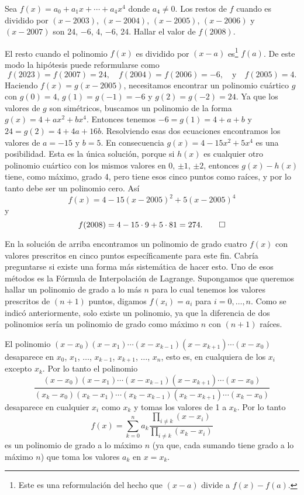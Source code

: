 \begin{example}
    Sea $f(x) = a_0 + a_1 x + \cdots + a_4 x^4$ donde $a_4 \neq 0$.
    Los restos de $f$ cuando es dividido por $(x - 2003)$, $(x - 2004)$, $(x - 2005)$, $(x - 2006)$ y $(x - 2007)$ son 24, $-6$, 4, $-6$, 24.
    Hallar el valor de $f(2008)$.
\end{example}
\begin{solution}
    El resto cuando el polinomio $f(x)$ es dividido por $(x - a)$ es\footnote{Este es una reformulación del hecho que $(x - a)$ divide a $f(x) - f(a)$.} $f(a)$.
    De este modo la hipótesis puede reformularse como
    \[
        f(2023) = f(2007) = 24, \quad f(2004) = f(2006) = -6, \quad \text{y} \quad f(2005) = 4.
    \]
    Haciendo $f(x) = g(x - 2005)$, necesitamos encontrar un polinomio cuártico $g$ con $g(0) = 4$, $g(1) = g(-1) = -6$ y $g(2) = g(-2) = 24$.
    Ya que los valores de $g$ son simétricos, buscamos un polinomio de la forma $g(x) = 4 + ax^2 + bx^4$.
    Entonces tenemos $-6 = g(1) = 4 + a + b$ y $24 = g(2) = 4 + 4a + 16b$.
    Resolviendo esas dos ecuaciones encontramos los valores de $a = -15$ y $b = 5$.
    En consecuencia $g(x) = 4 - 15x^2 + 5x^4$ es una posibilidad.
    Esta es la única solución, porque si $h(x)$ es cualquier otro polinomio cuártico con los mismos valores en 0, $\pm 1$, $\pm 2$, entonces $g(x) - h(x)$ tiene, como máximo, grado 4, pero tiene esos cinco puntos como raíces, y por lo tanto debe ser un polinomio cero.
    Así
    \[
        f(x) = 4 - 15(x - 2005)^2 + 5(x - 2005)^4
    \]
    y
    \[
        f(2008) = 4 - 15\cdot 9 + 5\cdot 81 = 274. \qedhere
    \]
\end{solution}

En la solución de arriba encontramos un polinomio de grado cuatro $f(x)$ con valores prescritos en cinco puntos específicamente para este fin.
Cabría preguntarse si existe una forma más sistemática de hacer esto.
Uno de esos métodos es la Fórmula de Interpolación de Lagrange.
Supongamos que queremos hallar un polinomio de grado a lo más $n$ para lo cual tenemos los valores prescritos de $(n + 1)$ puntos, digamos $f(x_i) = a_i$ para $i = 0, \ldots, n$.
Como se indicó anteriormente, solo existe un polinomio, ya que la diferencia de dos polinomios sería un polinomio de grado como máximo $n$ con $(n + 1)$ raíces.

El polinomio $(x - x_0)(x - x_1)\cdots(x - x_{k - 1})(x - x_{k + 1})\cdots(x - x_0)$ desaparece en $x_0$, $x_1$, $\ldots$, $x_{k - 1}$, $x_{k + 1}$, $\ldots$, $x_n$, esto es, en cualquiera de los $x_i$ excepto $x_k$.
Por lo tanto el polinomio
\[
    \frac{(x - x_0)(x - x_1)\cdots(x - x_{k - 1})(x - x_{k + 1})\cdots(x - x_0)}{(x_k - x_0)(x_k - x_1)\cdots(x_k - x_{k - 1})(x_k - x_{k + 1})\cdots(x_k - x_0)}
\]
desaparece en cualquier $x_i$ como $x_k$ y tomas los valores de 1 a $x_k$.
Por lo tanto
\[
    f(x) = \sum_{k = 0}^{n} a_k \frac{\prod_{i \neq k} (x - x_i)}{\prod_{i \neq k} (x_k - x_i)}
\]
es un polinomio de grado a lo máximo $n$ (ya que, cada sumando tiene grado a lo máximo $n$) que toma los valores $a_k$ en $x = x_k$.


